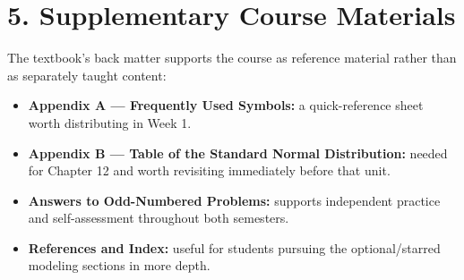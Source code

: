 \documentclass[11pt]{article}
\begin{document}
\section*{5. Supplementary Course Materials}

The textbook's back matter supports the course as reference material
rather than as separately taught content:
\begin{itemize}
\item \textbf{Appendix A --- Frequently Used Symbols:} a quick-reference
sheet worth distributing in Week 1.
\item \textbf{Appendix B --- Table of the Standard Normal Distribution:}
needed for Chapter 12 and worth revisiting immediately before that unit.
\item \textbf{Answers to Odd-Numbered Problems:} supports independent
practice and self-assessment throughout both semesters.
\item \textbf{References and Index:} useful for students pursuing the
optional/starred modeling sections in more depth.
\end{itemize}
\end{document}

